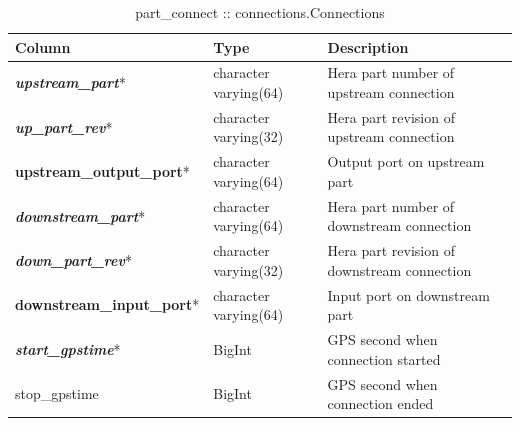 \documentclass{article}[10pt]
\begin{document}
\begin{table}[h]
\centering
\caption{part\_connect :: connections.Connections}
\begin{tabular}{| l | l | l |} \hline
{\bf Column} & {\bf Type} & {\bf Description} \\ \hline
{\bf \em upstream\_part}* &  character varying(64) & Hera part number of upstream connection \\ \hline
{\bf \em up\_part\_rev}* & character varying(32) & Hera part revision of upstream connection \\ \hline
{\bf upstream\_output\_port}* & character varying(64) & Output port on upstream part \\ \hline
{\bf \em downstream\_part}* & character varying(64) & Hera part number of downstream connection \\ \hline
{\bf \em down\_part\_rev}* & character varying(32) & Hera part revision of downstream connection \\ \hline
{\bf downstream\_input\_port}* & character varying(64) & Input port on downstream part \\ \hline
{\bf \em start\_gpstime}* & BigInt & GPS second when connection started \\ \hline
stop\_gpstime & BigInt & GPS second when connection ended \\ \hline
\end{tabular}
\end{table}
\end{document}
